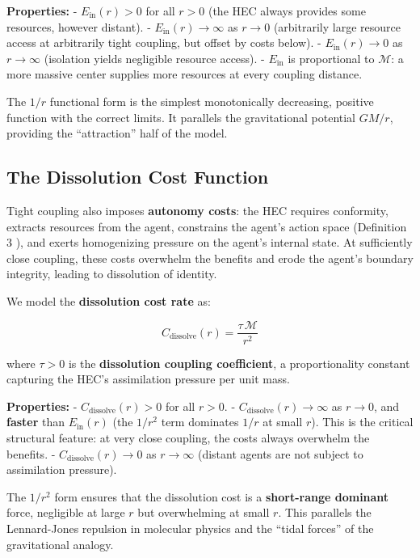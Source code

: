 \documentclass[11pt]{article}
\theoremstyle{plain}
\theoremstyle{definition}
\theoremstyle{remark}
\let\origsubsection\subsection
\renewcommand{\subsection}{\needspace{7\baselineskip}\origsubsection}
\begin{document}
\textbf{Properties:} - \(E_{\text{in}}(r) > 0\) for all \(r > 0\) (the
HEC always provides some resources, however distant). -
\(E_{\text{in}}(r) \to \infty\) as \(r \to 0\) (arbitrarily large
resource access at arbitrarily tight coupling, but offset by costs
below). - \(E_{\text{in}}(r) \to 0\) as \(r \to \infty\) (isolation
yields negligible resource access). - \(E_{\text{in}}\) is proportional
to \(\mathcal{M}\): a more massive center supplies more resources at
every coupling distance.

The \(1/r\) functional form is the simplest monotonically decreasing,
positive function with the correct limits. It parallels the
gravitational potential \(GM/r\), providing the ``attraction'' half of
the model.

\subsection{The Dissolution Cost
Function}\label{the-dissolution-cost-function}

Tight coupling also imposes \textbf{autonomy costs}: the HEC requires
conformity, extracts resources from the agent, constrains the agent's
action space (Definition 3 \citep{TC-I}), and exerts homogenizing
pressure on the agent's internal state. At sufficiently close coupling,
these costs overwhelm the benefits and erode the agent's boundary
integrity, leading to dissolution of identity.

We model the \textbf{dissolution cost rate} as:

\[C_{\text{dissolve}}(r) = \frac{\tau \, \mathcal{M}}{r^2}\]

where \(\tau > 0\) is the \textbf{dissolution coupling coefficient}, a
proportionality constant capturing the HEC's assimilation pressure per
unit mass.

\textbf{Properties:} - \(C_{\text{dissolve}}(r) > 0\) for all \(r > 0\).
- \(C_{\text{dissolve}}(r) \to \infty\) as \(r \to 0\), and
\textbf{faster} than \(E_{\text{in}}(r)\) (the \(1/r^2\) term dominates
\(1/r\) at small \(r\)). This is the critical structural feature: at
very close coupling, the costs always overwhelm the benefits. -
\(C_{\text{dissolve}}(r) \to 0\) as \(r \to \infty\) (distant agents are
not subject to assimilation pressure).

The \(1/r^2\) form ensures that the dissolution cost is a
\textbf{short-range dominant} force, negligible at large \(r\) but
overwhelming at small \(r\). This parallels the Lennard-Jones repulsion
in molecular physics and the ``tidal forces'' of the gravitational
analogy.
\end{document}
